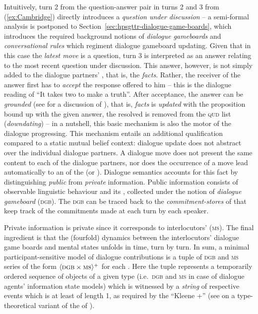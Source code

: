 \documentclass[output=paper
 	        ,biblatex
                ,babelshorthands
                ,newtxmath
                ,draftmode
                ,colorlinks, citecolor=brown
]{langscibook}
\begin{document}
Intuitively, turn 2 from the question-answer pair in turns 2 and 3 from (\ref{ex:Cambridge}) directly introduces a \emph{question under discussion} -- a semi-formal analysis is postponed to Section~\ref{sec:hpsgttr-dialogue-game-boards}, which introduces the required background notions of \emph{dialogue gameboards} and \emph{conversational rules} which regiment dialogue gameboard updating.
%
Given that in this case the \emph{latest move} is a question, turn 3 is interpreted as an answer relating to the most recent question under discussion.
%
This answer, however, is not simply added to the dialogue partners' , that is, the \emph{facts}.
%
Rather, the receiver of the answer first has to \emph{accept} the response offered to him -- this is the dialogue reading of \enquote{It takes two to make a truth}.
%
After acceptance, the answer can be \emph{grounded} (see \citealt[Chapter~4]{Clark:1996} for a discussion of ), that is, \emph{facts} is \emph{updated} with the proposition bound up with the given answer, the resolved  is removed from the \textsc{qud} list (\emph{downdating}) -- in a nutshell, this basic mechanism is also the motor of the dialogue progressing.
%
This mechanism entails an additional qualification compared to a static mutual belief context: dialogue update does not abstract over the individual dialogue partners.
%
A dialogue move does not present the same content to each of the dialogue partners, nor does the occurrence of a move lead automatically to an  of the  (or ).
%
Dialogue semantics accounts for this fact by distinguishing \emph{public} from \emph{private} information. 
%
Public information consists of observable linguistic behaviour and its , collected under the notion of \emph{dialogue gameboard} (\textsc{dgb}).
%
The \textsc{dgb} can be traced back to the \emph{commitment-stores} of \citet{Hamblin:1970} that keep track of the commitments made at each turn by each speaker. 

Private information is private since it corresponds to interlocutors'  (\textsc{ms}).
%
The final ingredient is that the (fourfold) dynamics between the interlocutors' dialogue game boards and mental states unfolds in time, turn by turn.
%
In sum, a minimal participant-sensitive model of dialogue contributions is a tuple of \textsc{dgb} and \textsc{ms} series of the form $\langle \textsc{dgb} \times \textsc{ms} \rangle^+$ for each . 
%
Here the tuple represents a temporarily ordered sequence of objects of a given type (i.e.\ \textsc{dgb} and \textsc{ms} in case of dialogue agents' information state models) which is witnessed by a \emph{string} of respective events which is at least of length 1, as required by the \enquote{Kleene +}\is{+}  (see \citealt[Section~2.7]{Cooper:Ginzburg:2015} on a type-theoretical variant of the  of \citealt{Fernando:2011}).
\end{document}
